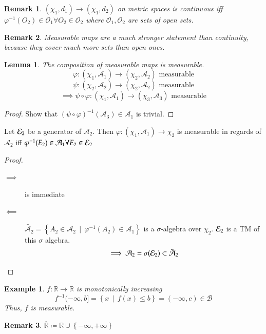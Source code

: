 \documentclass[a4paper]{article}
\newcounter{lecref}[section]
\numberwithin{lecref}{section}
\theoremstyle{break}
\newtheorem{example}[lecref]{Example}
\newtheorem{lemma}[lecref]{Lemma}
\newtheorem*{Remark}{Remark}
\newcommand{\Set}[1]{\left\{#1\right\}}
\newcommand{\SetDef}[2]{\left\{#1\,\mid\,#2\right\}}
\begin{document}
\begin{Remark}
  $(\chi_1, d_1) \to (\chi_1, d_2)$ on metric spaces is continuous iff $\varphi^{-1}(O_2) \in \mathcal O_1 \forall O_2 \in \mathcal O_2$ where $\mathcal O_1, \mathcal O_2$ are sets of open sets.
\end{Remark}

\begin{Remark}
  Measurable maps are a much stronger statement than continuity, because they cover much more sets than open ones.
\end{Remark}

\begin{lemma}
  The composition of measurable maps is measurable.
  \[ \varphi: (\chi_1, \mathcal A_1) \to (\chi_2, \mathcal A_2) \text{ measurable} \]
  \[ \psi: (\chi_2, \mathcal A_2) \to (\chi_2, \mathcal A_2) \text{ measurable} \]
  \[ \implies \psi \circ \varphi: (\chi_1, \mathcal A_1) \to (\chi_3, \mathcal A_3) \text{ measurable} \]
\end{lemma}
\begin{proof}
  Show that $(\psi \circ \varphi)^{-1} (\mathcal A_3) \in \mathcal A_1$ is trivial.
\end{proof}

\begin{theorem}
  Let ${\mathcal E}_2$ be a generator of $\mathcal A_2$. Then $\varphi: (\chi_1, \mathcal A_1) \to \chi_2$ is measurable in regards of $\mathcal A_2$ iff $\varphi^{-1}(E_2) \in \mathcal A_1 \forall E_2 \in {\mathcal E}_2$
\end{theorem}
\begin{proof}
  \begin{description}
    \item[$\implies$] is immediate
    \item[$\impliedby$] $\tilde{\mathcal A_2} = \SetDef{A_2 \in \mathcal A_2}{\varphi^{-1}(A_2) \in \mathcal A_1}$ is a $\sigma$-algebra over $\chi_2$. ${\mathcal E}_2$ is a TM of this $\sigma$ algebra.
    \[ \implies \mathcal A_2 = \sigma({\mathcal E}_2) \subset {\tilde{\mathcal A}}_2 \]
  \end{description}
\end{proof}

\begin{example}
  $f: \mathbb R \to \mathbb R$ is monotonically increasing
  \[ f^{-1}(-\infty,b] = \SetDef{x}{f(x) \leq b} = (-\infty, c) \in \mathcal B \]
  Thus, $f$ is measurable.
\end{example}

\begin{Remark}
  $\overline{\mathbb R} \coloneqq \mathbb R \cup \Set{-\infty, +\infty}$
\end{Remark}
\end{document}

